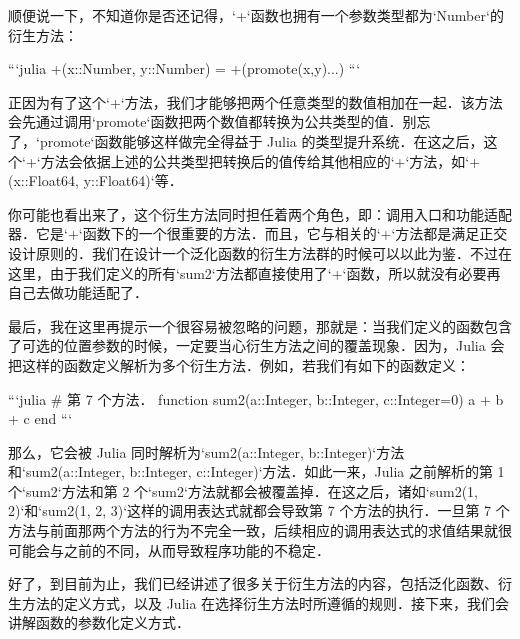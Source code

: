 顺便说一下，不知道你是否还记得，`+`函数也拥有一个参数类型都为`Number`的衍生方法：

```julia
+(x::Number, y::Number) = +(promote(x,y)...)
```

正因为有了这个`+`方法，我们才能够把两个任意类型的数值相加在一起．该方法会先通过调用`promote`函数把两个数值都转换为公共类型的值．别忘了，`promote`函数能够这样做完全得益于 Julia 的类型提升系统．在这之后，这个`+`方法会依据上述的公共类型把转换后的值传给其他相应的`+`方法，如`+(x::Float64, y::Float64)`等．

你可能也看出来了，这个衍生方法同时担任着两个角色，即：调用入口和功能适配器．它是`+`函数下的一个很重要的方法．而且，它与相关的`+`方法都是满足正交设计原则的．我们在设计一个泛化函数的衍生方法群的时候可以以此为鉴．不过在这里，由于我们定义的所有`sum2`方法都直接使用了`+`函数，所以就没有必要再自己去做功能适配了．

最后，我在这里再提示一个很容易被忽略的问题，那就是：当我们定义的函数包含了可选的位置参数的时候，一定要当心衍生方法之间的覆盖现象．因为，Julia 会把这样的函数定义解析为多个衍生方法．例如，若我们有如下的函数定义：

```julia
# 第 7 个方法．
function sum2(a::Integer, b::Integer, c::Integer=0)
    a + b + c
end
```

那么，它会被 Julia 同时解析为`sum2(a::Integer, b::Integer)`方法和`sum2(a::Integer, b::Integer, c::Integer)`方法．如此一来，Julia 之前解析的第 1 个`sum2`方法和第 2 个`sum2`方法就都会被覆盖掉．在这之后，诸如`sum2(1, 2)`和`sum2(1, 2, 3)`这样的调用表达式就都会导致第 7 个方法的执行．一旦第 7 个方法与前面那两个方法的行为不完全一致，后续相应的调用表达式的求值结果就很可能会与之前的不同，从而导致程序功能的不稳定．

好了，到目前为止，我们已经讲述了很多关于衍生方法的内容，包括泛化函数、衍生方法的定义方式，以及 Julia 在选择衍生方法时所遵循的规则．接下来，我们会讲解函数的参数化定义方式．